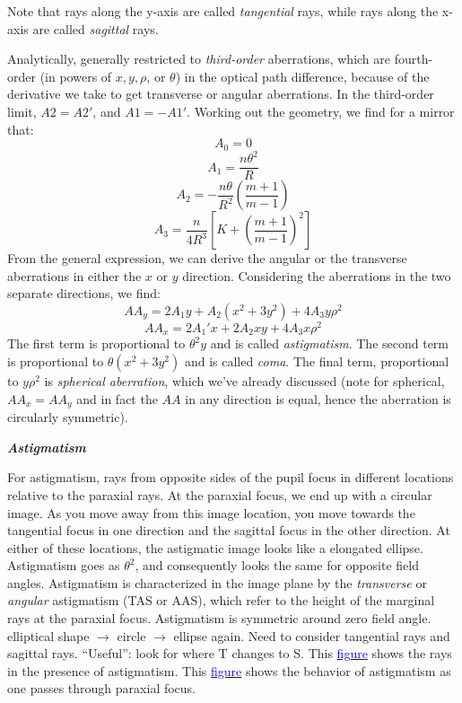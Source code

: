\documentclass[12pt]{article}
\begin{document}
Note that rays along the y-axis are called \emph{tangential} rays,
while rays along the x-axis are called \emph{sagittal} rays.

Analytically, generally restricted to
\emph{third-order} aberrations, which are fourth-order
(in powers of $x, y, \rho$, or $\theta$) in the optical path
difference, because of the derivative we take to get transverse or
angular aberrations. In the third-order limit,
$A2 = A2'$, and $A1 = -A1'$. Working
out the geometry, we find for a mirror that:{$$
    A_{0} = 0 $$$$
    A_{1} = \frac{n\theta^{2}}{R}$$$$
    A_{2} = -\frac{n\theta}{R^{2}}\left(\frac{m+1}{m-1}\right)$$$$
    A_{3} = \frac{n}{4R^{3}}\left[K+\left(\frac{m+1}{m-1}\right)^{2}\right]
$$}
From the general expression, we can derive the angular or the
transverse aberrations in either the $x$ or $y$ direction. Considering the
aberrations in the two separate directions, we find:{$$
    AA_y = 2A_1y + A_2(x^2+3y^2) + 4A_3y\rho^2  $$$$
    AA_x = 2A_1'x + 2A_2xy + 4A_3x\rho^2
$$}The first term is proportional to $\theta^{2}y$ and is called
\emph{astigmatism}. The second term is proportional to
$ \theta(x^2 +3y^2)$
and is called \emph{coma}. The final term, proportional to
$y\rho^{2}$
is \emph{spherical aberration}, which we've already discussed (note for
spherical, $AA_x = AA_y$ and in fact the $AA$ in any direction is equal,
hence the aberration is circularly symmetric).

\textbf{\emph{Astigmatism}}
\par For astigmatism, rays from opposite sides of the pupil focus in
different locations relative to the paraxial rays. At the paraxial
focus, we end up with a circular image. As you move away from this
image location, you move towards the tangential focus in one
direction and the sagittal focus in the other direction. At either of
these locations, the astigmatic image looks like a elongated ellipse.
Astigmatism goes as $\theta^{2}$, and consequently looks the same
for opposite field angles. Astigmatism is characterized in the image
plane by the \emph{transverse} or \emph{angular} astigmatism (TAS or AAS), which
refer to the height of the marginal rays at the paraxial focus.
Astigmatism is symmetric around zero field angle.
\textcolor{myBlue}{%
    elliptical shape $\rightarrow$ circle $\rightarrow$ ellipse again.
    Need to consider tangential rays and sagittal rays. ``Useful'':
    look for where T changes to S.
}
This \href{http://astronomy.nmsu.edu/holtz/a535/html/diagrams/a535/astig.htm}
{\textcolor{blue}{figure}} shows the rays in the presence of astigmatism.
This \href{http://astronomy.nmsu.edu/holtz/a535/html/diagrams/a535/z5.htm}
{\textcolor{blue}{figure}}
shows the behavior of astigmatism as one passes through paraxial focus.
\end{document}
